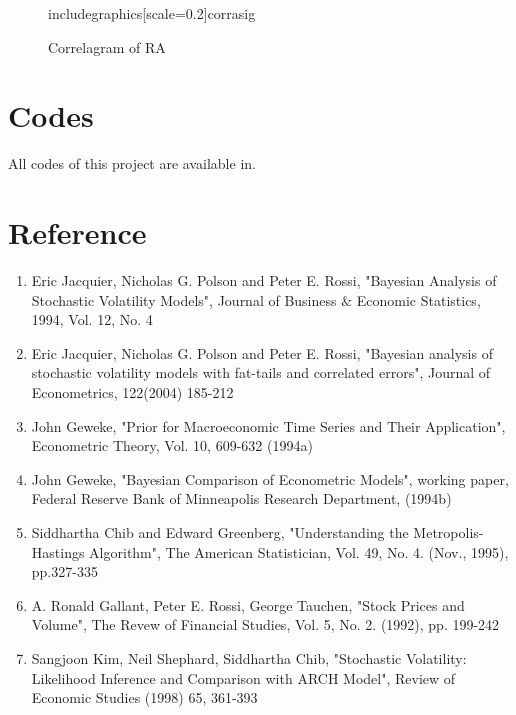 \documentclass{article}
\begin{document}
\begin{figure}[H]
includegraphics[scale=0.2]{corrasig}
\caption{Correlagram of RA}\label{8}
\end{figure}

\section{Codes}
All codes of this project are available in. 

\section{Reference}
\begin{enumerate}
\item
Eric Jacquier, Nicholas G. Polson and Peter E. Rossi, "Bayesian Analysis of Stochastic Volatility Models", Journal of Business $\&$ Economic Statistics, 1994, Vol. 12, No. 4
\item
Eric Jacquier, Nicholas G. Polson and Peter E. Rossi, "Bayesian analysis of stochastic volatility models with fat-tails and correlated errors", Journal of Econometrics, 122(2004) 185-212
\item
John Geweke, "Prior for Macroeconomic Time Series and Their Application", Econometric Theory, Vol. 10, 609-632 (1994a)
\item
John Geweke, "Bayesian Comparison of Econometric Models", working paper, Federal Reserve Bank of
Minneapolis Research Department, (1994b)
\item
Siddhartha Chib and Edward Greenberg, "Understanding the Metropolis-Hastings Algorithm", The American Statistician, Vol. 49, No. 4. (Nov., 1995), pp.327-335
\item
A. Ronald Gallant, Peter E. Rossi, George Tauchen, "Stock Prices and Volume", The Revew of Financial Studies, Vol. 5, No. 2. (1992), pp. 199-242
\item
Sangjoon Kim, Neil Shephard, Siddhartha Chib, "Stochastic Volatility: Likelihood Inference and Comparison with ARCH Model", Review of Economic Studies (1998) 65, 361-393
\end{enumerate}
\end{document}
